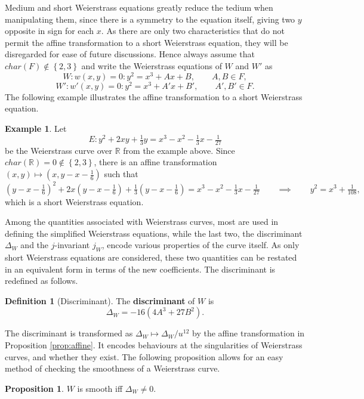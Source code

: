\documentclass{article}
\newcommand{\R}{\mathbb{R}}
\newcommand{\rb}[1]{\left( #1 \right)}
\newcommand{\cb}[1]{\left\{ #1 \right\}}
\theoremstyle{definition}
\newtheorem*{definition}{Definition}
\newtheorem*{example}{Example}
\newtheorem{proposition}{Proposition}[subsection]
\begin{document}
Medium and short Weierstrass equations greatly reduce the tedium when manipulating them, since there is a symmetry to the equation itself, giving two $ y $ opposite in sign for each $ x $. As there are only two characteristics that do not permit the affine transformation to a short Weierstrass equation, they will be disregarded for ease of future discussions. Hence always assume that $ char\rb{F} \notin \cb{2, 3} $ and write the Weierstrass equations of $ W $ and $ W' $ as
$$ W : w\rb{x, y} = 0 : y^2 = x^3 + Ax + B, \qquad A, B \in F, $$
$$ W' : w'\rb{x, y} = 0 : y^2 = x^3 + A'x + B', \qquad A', B' \in F. $$
The following example illustrates the affine transformation to a short Weierstrass equation.

\begin{example}
Let
$$ E : y^2 + 2xy + \tfrac{1}{3}y = x^3 - x^2 - \tfrac{1}{3}x - \tfrac{1}{27} $$
be the Weierstrass curve over $ \R $ from the example above. Since $ char\rb{\R} = 0 \notin \cb{2, 3} $, there is an affine transformation $ \rb{x, y} \mapsto \rb{x, y - x - \tfrac{1}{6}} $ such that
$$ \rb{y - x - \tfrac{1}{6}}^2 + 2x\rb{y - x - \tfrac{1}{6}} + \tfrac{1}{3}\rb{y - x - \tfrac{1}{6}} = x^3 - x^2 - \tfrac{1}{3}x - \tfrac{1}{27} \qquad \implies \qquad y^2 = x^3 + \tfrac{1}{108}, $$
which is a short Weierstrass equation.
\end{example}

Among the quantities associated with Weierstrass curves, most are used in defining the simplified Weierstrass equations, while the last two, the discriminant $ \Delta_W $ and the $ j $-invariant $ j_W $, encode various properties of the curve itself. As only short Weierstrass equations are considered, these two quantities can be restated in an equivalent form in terms of the new coefficients. The discriminant is redefined as follows.

\begin{definition}[Discriminant]
The \textbf{discriminant} of $ W $ is
$$ \Delta_W = -16\rb{4A^3 + 27B^2}. $$
\end{definition}

The discriminant is transformed as $ \Delta_W \mapsto \Delta_W / u^{12} $ by the affine transformation in Proposition \ref{prop:affine}. It encodes behaviours at the singularities of Weierstrass curves, and whether they exist. The following proposition allows for an easy method of checking the smoothness of a Weierstrass curve.

\begin{proposition}
$ W $ is smooth iff $ \Delta_W \ne 0 $.
\end{proposition}
\end{document}
